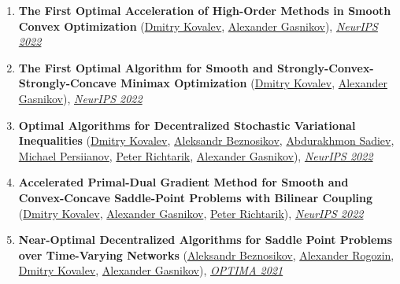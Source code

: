 \begin{enumerate}
\item \textbf{The First Optimal Acceleration of High-Order Methods in Smooth Convex Optimization} (\href{https://www.dmitry-kovalev.com}{\color{linkcolour}Dmitry Kovalev}, \href{https://scholar.google.ru/citations?user=AmeE8qkAAAAJ}{\color{linkcolour}Alexander Gasnikov}), \href{https://papers.nips.cc/paper_files/paper/2022/hash/e56f394bbd4f0ec81393d767caa5a31b-Abstract-Conference.html}{\em \color{black}NeurIPS 2022}
\item \textbf{The First Optimal Algorithm for Smooth and Strongly-Convex-Strongly-Concave Minimax Optimization} (\href{https://www.dmitry-kovalev.com}{\color{linkcolour}Dmitry Kovalev}, \href{https://scholar.google.ru/citations?user=AmeE8qkAAAAJ}{\color{linkcolour}Alexander Gasnikov}), \href{https://papers.nips.cc/paper_files/paper/2022/hash/5e2ed801f62102f531d109d7c6e1b62f-Abstract-Conference.html}{\em \color{black}NeurIPS 2022}
\item \textbf{Optimal Algorithms for Decentralized Stochastic Variational Inequalities} (\href{https://www.dmitry-kovalev.com}{\color{linkcolour}Dmitry Kovalev}, \href{https://anbeznosikov.github.io}{\color{linkcolour}Aleksandr Beznosikov}, \href{https://scholar.google.com/citations?user=R-xZRIAAAAAJ&hl=ru}{\color{linkcolour}Abdurakhmon Sadiev}, \href{}{\color{linkcolour}Michael Persiianov}, \href{https://richtarik.org}{\color{linkcolour}Peter Richtarik}, \href{https://scholar.google.ru/citations?user=AmeE8qkAAAAJ}{\color{linkcolour}Alexander Gasnikov}), \href{https://papers.nips.cc/paper_files/paper/2022/hash/c959bb2cb164d37569a17fa67494d69a-Abstract-Conference.html}{\em \color{black}NeurIPS 2022}
\item \textbf{Accelerated Primal-Dual Gradient Method for Smooth and Convex-Concave Saddle-Point Problems with Bilinear Coupling} (\href{https://www.dmitry-kovalev.com}{\color{linkcolour}Dmitry Kovalev}, \href{https://scholar.google.ru/citations?user=AmeE8qkAAAAJ}{\color{linkcolour}Alexander Gasnikov}, \href{https://richtarik.org}{\color{linkcolour}Peter Richtarik}), \href{https://papers.nips.cc/paper_files/paper/2022/hash/883f66687a521536c505f9b2fbdcbf1e-Abstract-Conference.html}{\em \color{black}NeurIPS 2022}
\item \textbf{Near-Optimal Decentralized Algorithms for Saddle Point Problems over Time-Varying Networks} (\href{https://anbeznosikov.github.io}{\color{linkcolour}Aleksandr Beznosikov}, \href{https://scholar.google.com/citations?user=sEjyzkgAAAAJ}{\color{linkcolour}Alexander Rogozin}, \href{https://www.dmitry-kovalev.com}{\color{linkcolour}Dmitry Kovalev}, \href{https://scholar.google.ru/citations?user=AmeE8qkAAAAJ}{\color{linkcolour}Alexander Gasnikov}), \href{https://link.springer.com/chapter/10.1007/978-3-030-91059-4_18}{\em \color{black}OPTIMA 2021}

\end{enumerate}

